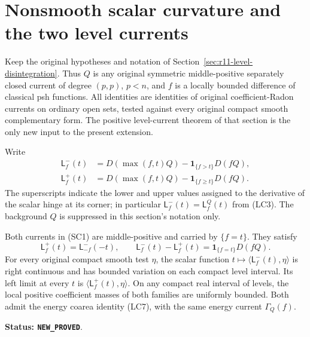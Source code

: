 \section{Nonsmooth scalar curvature and the two level currents}
\label{sec:r11-nonsmooth-scalar-curvature}

Keep the original hypotheses and notation of
Section~\ref{sec:r11-level-disintegration}.  Thus $Q$ is any
original symmetric middle-positive separately closed current of
degree $(p,p)$, $p<n$, and $f$ is a locally bounded difference
of classical psh functions.  All identities are identities of
original coefficient-Radon currents on ordinary open sets, tested
against every original compact smooth complementary form.  The
positive level-current theorem of that section is the only new
input to the present extension.

\begin{definition}
Write
\[
 \begin{split}
 \mathsf L_f^{-}(t)
    &=D(\max(f,t)Q)-\mathbf1_{\{f>t\}}D(fQ),\\
 \mathsf L_f^{+}(t)
    &=D(\max(f,t)Q)-\mathbf1_{\{f\geq t\}}D(fQ).
 \end{split}
 \tag{SC1}
\]
The superscripts indicate the lower and upper values assigned to
the derivative of the scalar hinge at its corner; in particular
$\mathsf L_f^{-}(t)=\mathsf L_f^Q(t)$ from (LC3).
The background $Q$ is suppressed in this section's notation only.
\end{definition}

\begin{proposition}
\label{prop:r11-two-level-currents}
Both currents in (SC1) are middle-positive and carried by
$\{f=t\}$.  They satisfy
\[
 \mathsf L_f^{+}(t)=\mathsf L_{-f}^{-}(-t),\qquad
 \mathsf L_f^{-}(t)-\mathsf L_f^{+}(t)
                      =\mathbf1_{\{f=t\}}D(fQ).
 \tag{SC2}
\]
For every original compact smooth test $\eta$, the scalar function
$t\mapsto\langle\mathsf L_f^{-}(t),\eta\rangle$ is right
continuous and has bounded variation on each compact level interval.
Its left limit at every $t$ is
$\langle\mathsf L_f^{+}(t),\eta\rangle$.  On any compact real
interval of levels, the local positive coefficient masses of both
families are uniformly bounded.  Both admit the energy coarea
identity (LC7), with the same energy current $\Gamma_Q(f)$.
\end{proposition}

\noindent\textbf{Status: \texttt{NEW\_PROVED}}.

